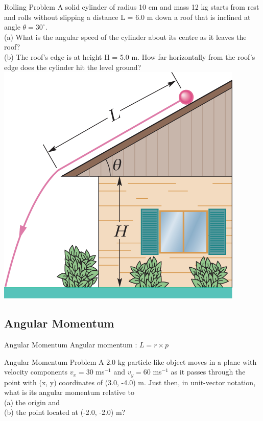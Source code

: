   \begin{frame}{Rolling Problem}
\small
A solid cylinder of radius 10 cm and mass 12 kg starts from rest and rolls without slipping a distance L = 6.0 m down a roof that is inclined at angle $\theta = 30^{\circ}$.\\[1ex]
 (a) What is the angular speed of the cylinder about its centre as it leaves the roof? \\[1ex]
 (b) The roof's edge is at height H = 5.0 m. How far horizontally from the roof's edge does the cylinder hit the level ground?\\[1ex]

\includegraphics[scale=0.8]{roof}
\end{frame}


 \subsection{ Angular Momentum}
 
   \begin{frame}{Angular Momentum }
\small
Angular momentum : $L = r \times p$\\[1ex]
\end{frame}



  \begin{frame}{Angular Momentum Problem}
\small
A 2.0 kg particle-like object moves in a plane with velocity components $v_x = 30$ ms$^{-1}$ and $v_y = 60$ ms$^{-1}$ as it passes through the point with (x, y) coordinates of (3.0, -4.0) m. Just then, in unit-vector notation, what is its angular momentum relative to \\[1ex]
(a) the origin and \\[1ex]
(b) the point located at (-2.0, -2.0) m?\\[1ex]
\end{frame}
